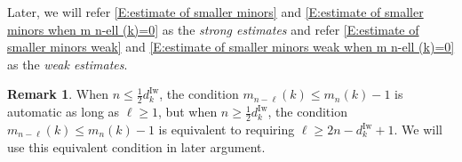 \documentclass[12pt]{amsart}
\theoremstyle{definition}
\newtheorem{remark}[subsection]{Remark}
\numberwithin{equation}{subsection}
\newcommand{\new}{\mathrm{new}}
\newcommand{\Iw}{\mathrm{Iw}}
\newcommand{\ur}{\mathrm{ur}}
\begin{document}
Later, we will refer \eqref{E:estimate of smaller minors} and \eqref{E:estimate of smaller minors when m n-ell (k)=0} as the \emph{strong estimates} and refer \eqref{E:estimate of smaller minors weak} and \eqref{E:estimate of smaller minors weak when m n-ell (k)=0} as the \emph{weak estimates}.
\begin{remark}\label{R:equivalent characterization of m n-l (k)< m n(k)}
When $n \leq \frac 12d_k^\Iw$, the condition $m_{n-\ell}(k)\leq m_n(k)-1$ is automatic as long as $\ell \geq 1$, but when $n\geq \tfrac 12 d_k^\Iw$, the condition $m_{n-\ell}(k)\leq m_n(k)-1$ is equivalent to requiring $\ell\geq 2n-d_k^\Iw+1$. We will use this equivalent condition in later argument. 
\end{remark}
\end{document}
